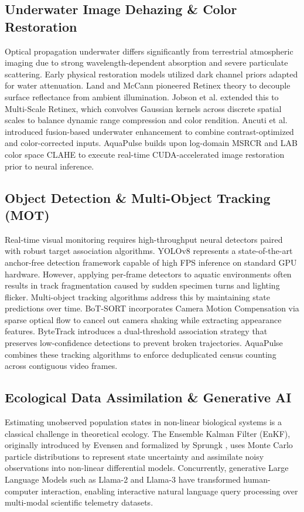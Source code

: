 \documentclass[11pt,a4paper]{article}
\newcommand{\citeblue}[1]{\cite{#1}}
\begin{document}
\subsection{Underwater Image Dehazing \& Color Restoration}
Optical propagation underwater differs significantly from terrestrial atmospheric imaging due to strong wavelength-dependent absorption and severe particulate scattering. Early physical restoration models utilized dark channel priors adapted for water attenuation. Land and McCann \citeblue{land1971lightness} pioneered Retinex theory to decouple surface reflectance from ambient illumination. Jobson et al. \citeblue{jobson1997multiscale} extended this to Multi-Scale Retinex, which convolves Gaussian kernels across discrete spatial scales to balance dynamic range compression and color rendition. Ancuti et al. \citeblue{ancuti2012enhancing} introduced fusion-based underwater enhancement to combine contrast-optimized and color-corrected inputs. AquaPulse builds upon log-domain MSRCR and LAB color space CLAHE to execute real-time CUDA-accelerated image restoration prior to neural inference.

\subsection{Object Detection \& Multi-Object Tracking (MOT)}
Real-time visual monitoring requires high-throughput neural detectors paired with robust target association algorithms. YOLOv8 \citeblue{jocher2023ultralytics} represents a state-of-the-art anchor-free detection framework capable of high FPS inference on standard GPU hardware. However, applying per-frame detectors to aquatic environments often results in track fragmentation caused by sudden specimen turns and lighting flicker. Multi-object tracking algorithms address this by maintaining state predictions over time. BoT-SORT \citeblue{aharon2022botsort} incorporates Camera Motion Compensation via sparse optical flow to cancel out camera shaking while extracting appearance features. ByteTrack \citeblue{zhang2022bytetrack} introduces a dual-threshold association strategy that preserves low-confidence detections to prevent broken trajectories. AquaPulse combines these tracking algorithms to enforce deduplicated census counting across contiguous video frames.

\subsection{Ecological Data Assimilation \& Generative AI}
Estimating unobserved population states in non-linear biological systems is a classical challenge in theoretical ecology. The Ensemble Kalman Filter (EnKF), originally introduced by Evensen \citeblue{evensen2009data} and formalized by Sprungk \citeblue{sprungk2023}, uses Monte Carlo particle distributions to represent state uncertainty and assimilate noisy observations into non-linear differential models. Concurrently, generative Large Language Models such as Llama-2 and Llama-3 \citeblue{touvron2023llama, dubey2024llama3} have transformed human-computer interaction, enabling interactive natural language query processing over multi-modal scientific telemetry datasets.
\end{document}
